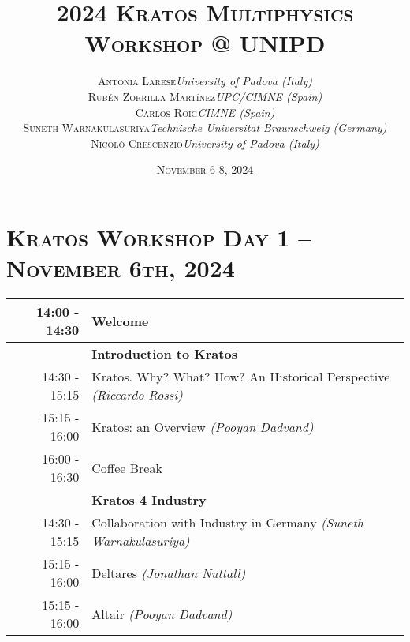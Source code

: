 \documentclass{article}
\begin{document}
\title{
   \Huge
   2024 \textsc{Kratos Multiphysics\\Workshop @ UNIPD}
}
\author{
   \small
   \begin{tabular}{rl}
      \textsc{Antonia Larese} & \textit{University of Padova (Italy)} \\
      \textsc{Rubén Zorrilla Martínez} & \textit{UPC/CIMNE (Spain)} \\
      \textsc{Carlos Roig} & \textit{CIMNE (Spain)} \\
      \textsc{Suneth Warnakulasuriya} & \textit{Technische Universitat Braunschweig (Germany)} \\
      \textsc{Nicol\`o Crescenzio} & \textit{University of Padova (Italy)}
   \end{tabular}
}
\date{\textsc{November} 6-8, 2024}
\maketitle

\renewcommand{\arraystretch}{1.5}

\section*{\centering\textsc{Kratos Workshop Day 1 -- November 6th, 2024}}

\begin{table}[h]\centering
   \begin{tabularx}{0.85\textwidth}{r|X}
      \toprule%
      \rowcolor{SeaGreen3!5!} 14:00 - 14:30 & Welcome \\%
      \midrule%
                    & {\large \textbf{Introduction to Kratos}} \\%
      14:30 - 15:15 & Kratos. Why? What? How? An Historical Perspective \textit{(Riccardo Rossi)}\\%
      15:15 - 16:00 & Kratos: an Overview \textit{(Pooyan Dadvand)}\\%
      \midrule%
      \rowcolor{SeaGreen3!5!} 16:00 - 16:30 & Coffee Break \\%
      \midrule%
                    & {\large \textbf{Kratos 4 Industry}} \\%
      14:30 - 15:15 & Collaboration with Industry in Germany \textit{(Suneth Warnakulasuriya)}\\%
      15:15 - 16:00 & Deltares \textit{(Jonathan Nuttall)}\\%
      15:15 - 16:00 & Altair \textit{(Pooyan Dadvand)}\\%
      \bottomrule
   \end{tabularx}
\end{table}
\end{document}
